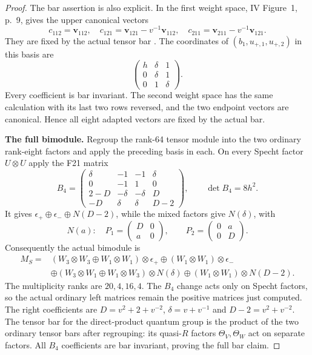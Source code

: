 \begin{proof}
The bar assertion is also explicit. In the first weight space,
IV Figure~1, p.~9, gives the upper canonical vectors
\[
 c_{112}=\mathbf v_{112},\quad
 c_{121}=\mathbf v_{121}-v^{-1}\mathbf v_{112},\quad
 c_{211}=\mathbf v_{211}-v^{-1}\mathbf v_{121}.
\]
They are fixed by the actual tensor bar
\cite[\S6.2, Theorem~6.4, p.~34]{IV}.
The coordinates of $(b_1,u_{+,1},u_{+,2})$ in this basis are
\[
 \begin{pmatrix}h&\delta&1\\0&\delta&1\\0&1&\delta\end{pmatrix}.
\]
Every coefficient is bar invariant. The second weight space has
the same calculation with its last two rows reversed, and the two
endpoint vectors are canonical. Hence all eight adapted vectors
are fixed by the actual bar.

\par\smallskip\noindent\textbf{The full bimodule.}\quad
Regroup the rank-64 tensor module into the two ordinary rank-eight
factors and apply the preceding basis in each. On every Specht
factor $U\otimes U$ apply the F21 matrix
\[
 B_4=\begin{pmatrix}
 \delta&-1&-1&\delta\\0&-1&1&0\\
 2-D&-\delta&-\delta&D\\-D&\delta&\delta&D-2
 \end{pmatrix},\qquad \det B_4=8h^2.
\]
It gives $\epsilon_+\oplus\epsilon_-\oplus N(D-2)$,
while the mixed factors give $N(\delta)$, with
\[
 N(a):\quad
 P_1=\begin{pmatrix}D&0\\a&0\end{pmatrix},\qquad
 P_2=\begin{pmatrix}0&a\\0&D\end{pmatrix}.
\]
Consequently the actual bimodule is
\begin{align*}
 M_S={}&(W_3\otimes W_3\oplus W_1\otimes W_1)\otimes\epsilon_+
       \oplus(W_1\otimes W_1)\otimes\epsilon_-\\
 &\oplus(W_3\otimes W_1\oplus W_1\otimes W_3)\otimes N(\delta)
       \oplus(W_1\otimes W_1)\otimes N(D-2).
\end{align*}
The multiplicity ranks are $20,4,16,4$.
The $B_4$ change acts only on Specht factors, so the actual
ordinary left matrices remain the positive matrices just computed.
The right coefficients are $D=v^2+2+v^{-2}$,
$\delta=v+v^{-1}$ and $D-2=v^2+v^{-2}$.
The tensor bar for the direct-product quantum group is the product
of the two ordinary tensor bars after regrouping: its quasi-$R$
factors $\Theta_V,\Theta_W$ act on separate factors.
All $B_4$ coefficients are bar invariant, proving the full bar claim.


\end{proof}
